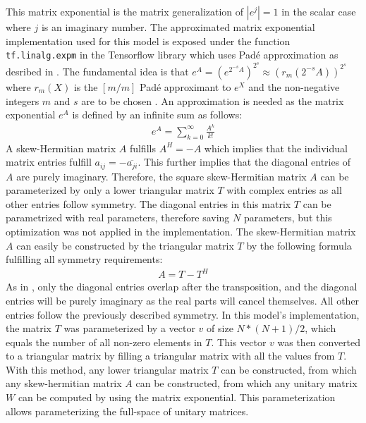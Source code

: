 \documentclass[draft,final]{vutinfth} %
\begin{document}
    This matrix exponential is the matrix generalization of $|e^j|=1$ in the scalar case where $j$ is an imaginary number.
    The approximated matrix exponential implementation used for this model is exposed under the function \texttt{tf.linalg.expm} in the Tensorflow library \cite{Tensorflow} which uses Padé approximation as desribed in \cite{expm}.
    The fundamental idea is that $e^A = (e^{2^{-s}A})^{2^s} \approx (r_m(2^{-s}A))^{2^s}$ where $r_m(X)$ is the $[m/m]$ Padé approximant to $e^X$ and the non-negative integers $m$ and $s$ are to be chosen \cite[p. 1]{expm}.
    An approximation is needed as the matrix exponential $e^A$ is defined by an infinite sum as follows:
    \begin{align}
        \label{expm_definition}
        e^A = \sum_{k=0}^{\infty} \frac{A^k}{k!}
    \end{align}
    A skew-Hermitian matrix $A$ fulfills $A^H = -A$ which implies that the individual matrix entries fulfill $a_{ij} = -\overline{a_{ji}}$.
    This further implies that the diagonal entries of $A$ are purely imaginary.
    Therefore, the square skew-Hermitian matrix $A$ can be parameterized by only a lower triangular matrix $T$ with complex entries as all other entries follow symmetry.
    The diagonal entries in this matrix $T$ can be parametrized with real parameters, therefore saving $N$ parameters, but this optimization was not applied in the implementation.
    The skew-Hermitian matrix $A$ can easily be constructed by the triangular matrix $T$ by the following formula fulfilling all symmetry requirements:
    \begin{align}
        \label{skew_hermitian}
        A = T - T^H
    \end{align}
    As in , only the diagonal entries overlap after the transposition, and the diagonal entries will be purely imaginary as the real parts will cancel themselves.
    All other entries follow the previously described symmetry.
    In this model's implementation, the matrix $T$ was parameterized by a vector $v$ of size $N*(N+1)/2$, which equals the number of all non-zero elements in $T$.
    This vector $v$ was then converted to a triangular matrix by filling a triangular matrix with all the values from $T$.
    With this method, any lower triangular matrix $T$ can be constructed, from which any skew-hermitian matrix $A$ can be constructed, from which any unitary matrix $W$ can be computed by using the matrix exponential.
    This parameterization allows parameterizing the full-space of unitary matrices.
\end{document}
